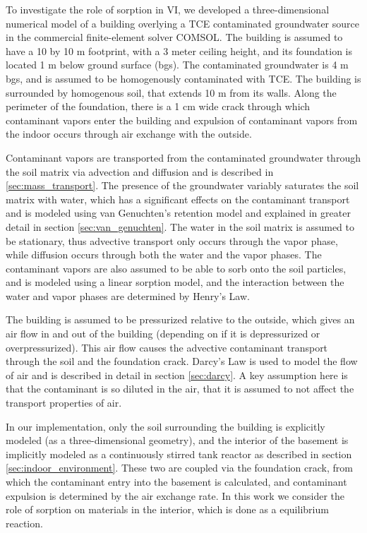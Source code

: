 To investigate the role of sorption in VI, we developed a three-dimensional numerical model of a building overlying a TCE contaminated groundwater source in the commercial finite-element solver COMSOL.
The building is assumed to have a 10 by 10 m footprint, with a 3 meter ceiling height, and its foundation is located 1 m below ground surface (bgs).
The contaminated groundwater is 4 m bgs, and is assumed to be homogenously contaminated with TCE.
The building is surrounded by homogenous soil, that extends 10 m from its walls.
Along the perimeter of the foundation, there is a 1 cm wide crack through which contaminant vapors enter the building and expulsion of contaminant vapors from the indoor occurs through air exchange with the outside.\par

Contaminant vapors are transported from the contaminated groundwater through the soil matrix via advection and diffusion and is described in \ref{sec:mass_transport}.
The presence of the groundwater variably saturates the soil matrix with water, which has a significant effects on the contaminant transport and is modeled using van Genuchten's retention model\cite{van_genuchten_closed-form_1980} and explained in greater detail in section \ref{sec:van_genuchten}.
The water in the soil matrix is assumed to be stationary, thus advective transport only occurs through the vapor phase, while diffusion occurs through both the water and the vapor phases.
The contaminant vapors are also assumed to be able to sorb onto the soil particles, and is modeled using a linear sorption model, and the interaction between the water and vapor phases are determined by Henry's Law.\par

The building is assumed to be pressurized relative to the outside, which gives an air flow in and out of the building (depending on if it is depressurized or overpressurized).
This air flow causes the advective contaminant transport through the soil and the foundation crack.
Darcy's Law is used to model the flow of air and is described in detail in section \ref{sec:darcy}.
A key assumption here is that the contaminant is so diluted in the air, that it is assumed to not affect the transport properties of air.\par

In our implementation, only the soil surrounding the building is explicitly modeled (as a three-dimensional geometry), and the interior of the basement is implicitly modeled as a continuously stirred tank reactor as described in section \ref{sec:indoor_environment}.
These two are coupled via the foundation crack, from which the contaminant entry into the basement is calculated, and contaminant expulsion is determined by the air exchange rate.
In this work we consider the role of sorption on materials in the interior, which is done as a equilibrium reaction.\par

